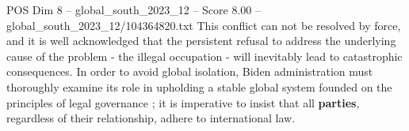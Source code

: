 \begin{textsample}{POS Dim 8 – global\_south\_2023\_12 – Score 8.00 – global\_south\_2023\_12/104364820.txt}
This conflict can not be resolved by force, and it is well acknowledged that the persistent refusal to address the underlying cause of the problem - the illegal occupation - will inevitably lead to catastrophic consequences.
In order to avoid global isolation, Biden administration must thoroughly examine its role in upholding a stable global system founded on the principles of legal governance ; it is imperative to insist that all \textbf{parties}, regardless of their relationship, adhere to international law.

\end{textsample}
